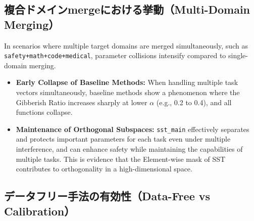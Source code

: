 \documentclass{article}
\begin{document}
\subsection{複合ドメインmergeにおける挙動（Multi-Domain Merging）}

In scenarios where multiple target domains are merged simultaneously, such as \texttt{safety+math+code+medical}, parameter collisions intensify compared to single-domain merging.
\begin{itemize}
    \item \textbf{Early Collapse of Baseline Methods:} When handling multiple task vectors simultaneously, baseline methods show a phenomenon where the Gibberish Ratio increases sharply at lower $\alpha$ (e.g., 0.2 to 0.4), and all functions collapse.
    \item \textbf{Maintenance of Orthogonal Subspaces:} \texttt{sst\_main} effectively separates and protects important parameters for each task even under multiple interference, and can enhance safety while maintaining the capabilities of multiple tasks. This is evidence that the Element-wise mask of SST contributes to orthogonality in a high-dimensional space.
\end{itemize}

\subsection{データフリー手法の有効性（Data-Free vs Calibration）}
\end{document}
